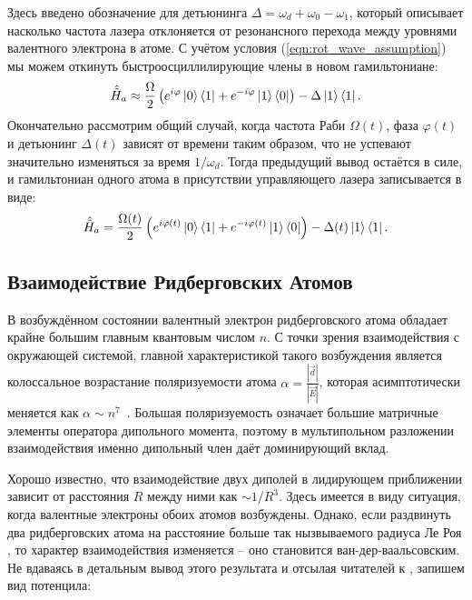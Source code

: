 Здесь введено обозначение для $\textbf{детьюнинга}$ $\Delta = \omega_d + \omega_0 - \omega_1$, который описывает насколько частота лазера отклоняется от резонансного перехода между уровнями валентного электрона в атоме.
С учётом условия (\ref{eqn:rot_wave_assumption}) мы можем откинуть быстроосциллилирующие члены в новом гамильтониане:
\begin{equation}
    \hat{\tilde{H}}_a \approx \frac{\Omega}{2}\left(
    e^{i \varphi} \ket{0} \bra{1} + e^{- i \varphi} \ket{1} \bra{0}\right) - \Delta \ket{1} \bra{1}.
\end{equation}
Окончательно рассмотрим общий случай, когда частота Раби $\Omega(t)$, фаза $\varphi(t)$ и детьюнинг $\Delta(t)$ зависят от времени таким образом, что не успевают значительно изменяться за время $1 / \omega_d$.
Тогда предыдущий вывод остаётся в силе, и гамильтониан одного атома в присутствии управляющего лазера записывается в виде:
\begin{equation}
    \hat{\tilde{H}}_a  = \frac{\Omega(t)}{2}\left(
    e^{i \varphi(t)} \ket{0} \bra{1} + e^{- i \varphi(t)} \ket{1} \bra{0}\right) - \Delta(t) \ket{1} \bra{1}.
\end{equation}

\subsection{Взаимодействие Ридберговских Атомов}
\label{sec:rydberg_interaction}


В возбуждённом состоянии валентный электрон ридберговского атома обладает крайне большим главным квантовым числом $n$.
С точки зрения взаимодействия с окружающей системой, главной характеристикой такого возбуждения является колоссальное возрастание поляризуемости атома $\alpha = \frac{|\vec{d}|}{|\vec{E}|}$,
которая асимптотически меняется как $\alpha \sim n^7$~\cite{gallagher1994rydberg}.
Большая поляризуемость означает большие матричные элементы оператора дипольного момента,
поэтому в мультипольном разложении взаимодействия именно дипольный член даёт доминирующий вклад.

Хорошо известно, что взаимодействие двух диполей в лидирующем приближении зависит от расстояния $R$ между ними как $\sim 1 / R^3$.
Здесь имеется в виду ситуация, когда валентные электроны обоих атомов возбуждены.
Однако, если раздвинуть два ридберговских атома на расстояние больше так нызвываемого радиуса Ле Роя \cite{leroy1974},
то характер взаимодействия изменяется -- оно становится ван-дер-ваальсовским.
Не вдаваясь в детальным вывод этого результата и отсылая читателей к \cite{saffman2010quantum}, запишем вид потенцила:

